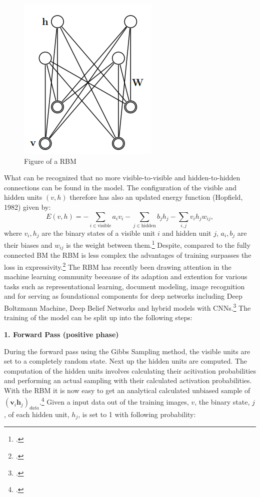 \begin{figure}[H]
    \centering
    \includegraphics[width=0.25\linewidth]{graphics/RBM_Modell.png}
    \caption{Figure of a \ac{RBM}}
\end{figure}
What can be recognized that no more visible-to-visible and hidden-to-hidden connections can be found in the model.
The configuration of the visible and hidden units \( (v, h) \) therefore has also an updated energy function (Hopfield, 1982) given by:
\begin{equation}
E(v, h) = - \sum_{i \in \text{visible}} a_i v_i - \sum_{j \in \text{hidden}} b_j h_j - \sum_{i,j} v_i h_j w_{ij},
\end{equation}
where \( v_i, h_j \) are the binary states of a visible unit \( i \) and hidden unit \( j \), \( a_i, b_j \) are their biases and \( w_{ij} \) is the weight between them.\footcite[Vgl.][3-4]{hintonPracticalGuideTraining2012a}
Despite, compared to the fully connected \ac{BM} the \ac{RBM} is less complex the advantages of training surpasses the loss in expressivity.\footcite[Vgl.][4]{huembeliPhysicsEnergybasedModels2022}
The \ac{RBM} has recently been drawing attention in the machine learning community beceause of its adaption and extention for various tasks such as representational learning, document modeling, image recognition and for
serving as foundational components for deep networks including Deep Boltzmann Machine, Deep Belief Networks and hybrid models with CNNs.\footcite[Vgl.][1186]{zhangOverviewRestrictedBoltzmann2018}
The training of the model can be split up into the following steps:

\textbf{1. Forward Pass (positive phase)}

During the forward pass using the Gibbs Sampling method, the visible units are set to a completely random state. Next up the hidden units are computed.
The computation of the hidden units involves calculating their acitivation probabilities and performing an actual sampling with their calculated activation probabilities.
With the \ac{RBM} it is now easy to get an analytical calculated unbiased sample of $(\textbf{v}_i\textbf{h}_j)_{data}$.\footcite[Vgl.][5]{hintonPracticalGuideTraining2012}
Given a input data out of the training images, \( v \), the binary state, \( j \), of each hidden unit,  \( h_j \), is set to 1 with following probability:

